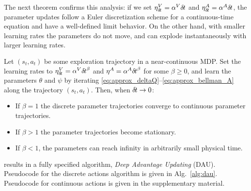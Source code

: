 The next theorem confirms this analysis: if we set 
$\eta^V_{\delta\hspace{-.1em}t} = \alpha^V {\delta\hspace{-.1em}t}$ and $\eta^A_{\delta\hspace{-.1em}t} = \alpha^A
{\delta\hspace{-.1em}t}$, the parameter updates follow a Euler discretization scheme
for a continuous-time equation and have a well-defined limit behavior. On
the other hand, with smaller learning rates the parameters do not move,
and can explode instantaneously with larger learning rates.

\begin{theorem}
	\label{th:cont-params}
Let $(s_t,a_t)$ be some exploration trajectory in a near-continuous MDP. Set the learning rates to $\eta^V_{\delta\hspace{-.1em}t} =
\alpha^V {\delta\hspace{-.1em}t}^\beta$ and $\eta^A = \alpha^A {\delta\hspace{-.1em}t}^\beta$ for some
$\beta\geq 0$, and learn the parameters $\theta$ and $\psi$ by iterating
\eqref{eq:approx_deltaQ}--\eqref{eq:approx_bellman_A} along the
trajectory $(s_t,a_t)$. Then, when
${\delta\hspace{-.1em}t}\to 0$:
	\begin{itemize}
		\item If $\beta = 1$ the discrete parameter trajectories converge to continuous parameter
			trajectories.%
		\item If $\beta>1$ the parameter trajectories become
		stationary.%
		\item If $\beta < 1$, the parameters can reach infinity
		in arbitrarily small physical time.%
	\end{itemize}
\end{theorem}


 results in a fully specified algorithm,
\emph{Deep Advantage Updating} (DAU).
Pseudocode for the discrete actions algorithm is given in Alg.~\ref{alg:dau}.
Pseudocode for continuous actions is given in the supplementary
material.

